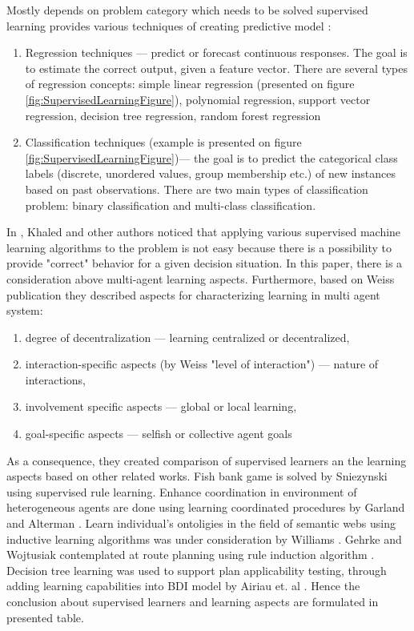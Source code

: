 Mostly depends on problem category which needs to be solved supervised learning provides various techniques of creating predictive model \cite{RegressionInML, ClassificationSupervisedLearning}:
\begin{enumerate}
	\item Regression techniques --- predict or forecast continuous responses. The goal is to estimate the correct output, given a feature vector. There are several types of regression concepts: simple linear regression (presented on figure  \ref{fig:SupervisedLearningFigure}), polynomial regression, support vector regression, decision tree regression, random forest regression
	\item Classification techniques (example is presented on figure  \ref{fig:SupervisedLearningFigure})--- the goal is to predict the categorical class labels (discrete, unordered values, group membership etc.) of new instances based on past observations. There are two main types of classification problem: binary classification and multi-class classification.
\end{enumerate}



In \cite{SLKhaled}, Khaled and other authors noticed that applying various supervised machine learning algorithms to the problem is not easy because there is a possibility to provide "correct" behavior for a given decision situation. In this paper, there is a consideration above multi-agent learning aspects. Furthermore, based on Weiss \cite{Weiss} publication they described aspects for characterizing learning in multi agent system:
\begin{enumerate}
	\item degree of decentralization --- learning centralized or decentralized,
	\item interaction-specific aspects (by Weiss \cite{Weiss} "level of interaction") --- nature of interactions,
	\item involvement specific aspects --- global or local learning,
	\item goal-specific aspects --- selfish or collective agent goals
\end{enumerate} 

As a consequence, they created comparison of supervised learners an the learning aspects based on other related works. Fish bank game is solved by Sniezynski \cite{Sniezynski2009SupervisedRL} using supervised rule learning. Enhance coordination in environment of heterogeneous agents are done using learning coordinated procedures by Garland and Alterman \cite{Garland2004AutonomousAT}. Learn individual's ontoligies in the field of semantic webs using inductive learning algorithms was under consideration by Williams \cite{Williams2004LearningTS}. Gehrke and Wojtusiak contemplated at route planning using rule induction algorithm \cite{Wojtusiak}. Decision tree learning was used to support plan applicability testing, through adding learning capabilities into BDI model by Airiau et. al \cite{Airaiu}. 
Hence the conclusion about supervised learners and learning aspects are formulated in presented table.

